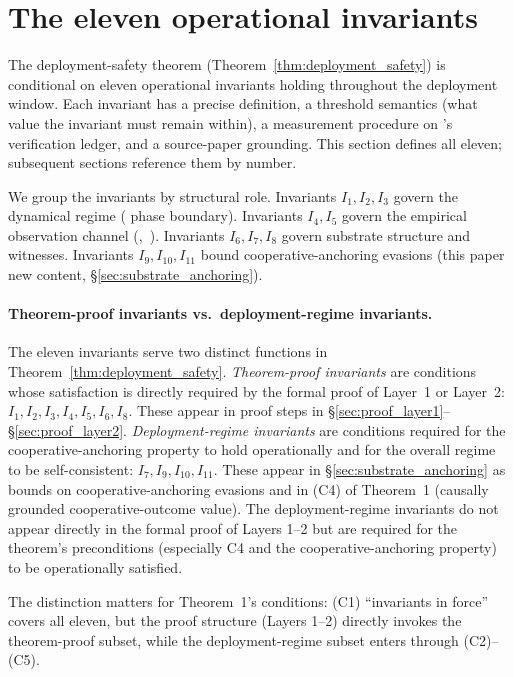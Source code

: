 \section{The eleven operational invariants}
\label{sec:invariants}

The deployment-safety theorem (Theorem~\ref{thm:deployment_safety}) is
conditional on eleven operational invariants holding throughout the deployment
window. Each invariant has a precise definition, a threshold semantics (what
value the invariant must remain within), a measurement procedure on
\citep[Exogenous~Verification]{lasser2026exo}'s verification ledger, and a
source-paper grounding. This section defines all eleven; subsequent sections
reference them by number.

We group the invariants by structural role. Invariants $I_1, I_2, I_3$ govern
the dynamical regime (\citep[Phase~Redundancy]{lasser2026phase} phase
boundary). Invariants $I_4, I_5$ govern the empirical observation channel
(\citep[Revealed~Sacrifice]{lasser2026paper8a},~\citep[Need~Sufficiency]{lasser2026paper8b}).
Invariants $I_6, I_7, I_8$ govern substrate structure and witnesses.
Invariants $I_9, I_{10}, I_{11}$ bound cooperative-anchoring evasions (this
paper new content, \S\ref{sec:substrate_anchoring}).

\paragraph{Theorem-proof invariants vs.\ deployment-regime invariants.}  The
eleven invariants serve two distinct functions in
Theorem~\ref{thm:deployment_safety}. \emph{Theorem-proof invariants} are
conditions whose satisfaction is directly required by the formal proof of
Layer~1 or Layer~2: $I_1, I_2, I_3, I_4, I_5, I_6, I_8$. These appear in proof
steps in \S\ref{sec:proof_layer1}--\S\ref{sec:proof_layer2}.
\emph{Deployment-regime invariants} are conditions required for the
cooperative-anchoring property to hold operationally and for the overall regime
to be self-consistent: $I_7, I_9, I_{10}, I_{11}$. These appear in
\S\ref{sec:substrate_anchoring} as bounds on cooperative-anchoring evasions and
in (C4) of Theorem~1 (causally grounded cooperative-outcome value). The
deployment-regime invariants do not appear directly in the formal proof of
Layers 1--2 but are required for the theorem's preconditions (especially C4 and
the cooperative-anchoring property) to be operationally satisfied.

The distinction matters for Theorem~1's conditions: (C1) ``invariants in
force'' covers all eleven, but the proof structure (Layers 1--2) directly
invokes the theorem-proof subset, while the deployment-regime subset enters
through (C2)--(C5).

